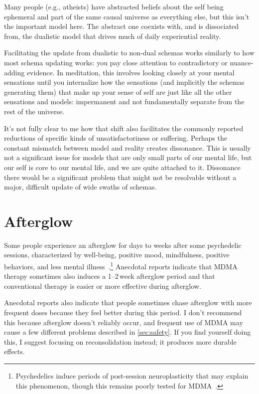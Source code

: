 \documentclass[11pt,oneside]{book}
\let\cite\parencite
\begin{document}
Many people (e.g., atheists) have abstracted beliefs about the self being ephemeral and part of the same causal universe as everything else, but this isn't the important model here. The abstract one coexists with, and is dissociated from, the dualistic model that drives much of daily experiential reality.

Facilitating the update from dualistic to non-dual schemas works similarly to how most schema updating works: you pay close attention to contradictory or nuance-adding evidence. In meditation, this involves looking closely at your mental sensations until you internalize how the sensations (and implicitly the schemas generating them) that make up your sense of self are just like all the other sensations and models: impermanent and not fundamentally separate from the rest of the universe.

It's not fully clear to me how that shift also facilitates the commonly reported reductions of specific kinds of unsatisfactoriness or suffering. Perhaps the constant mismatch between model and reality creates dissonance. This is usually not a significant issue for models that are only small parts of our mental life, but our self is core to our mental life, and we are quite attached to it. Dissonance there would be a significant problem that might not be resolvable without a major, difficult update of wide swaths of schemas.

\section{Afterglow}
\label{afterglow}
Some people experience an afterglow for days to weeks after some psychedelic sessions, characterized by well-being, positive mood, mindfulness, positive behaviors, and less mental illness~\cite{evansAfterglow}.\footnote{Psychedelics induce periods of post-session neuroplasticity that may explain this phenomenon, though this remains poorly tested for MDMA~\cite{calder2023towards}.} Anecdotal reports indicate that MDMA therapy sometimes also induces a 1--2\,week afterglow period and that conventional therapy is easier or more effective during afterglow.

Anecdotal reports also indicate that people sometimes chase afterglow with more frequent doses because they feel better during this period. I don't recommend this because afterglow doesn't reliably occur, and frequent use of MDMA may cause a few different problems described in \cref{sec:safety}. If you find yourself doing this, I suggest focusing on reconsolidation instead; it produces more durable effects.
\end{document}
